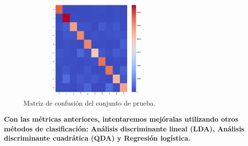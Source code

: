 \documentclass[paper=letter, fontsize=11pt]{scrartcl}
\numberwithin{equation}{section} %
\numberwithin{figure}{section} %
\numberwithin{table}{section} %
\begin{document}
\begin{figure}[H]
    \centering
    \includegraphics[width=8cm, height=5cm]{figure/baseline_confusion.png}
    \caption{Matriz de confusión del conjunto de prueba.}
    \label{fig:baseline_confusion}
\end{figure}


\textbf{Con las métricas anteriores, intentaremos mejóralas utilizando otros métodos de clasificación: Análisis discriminante lineal (LDA), Análisis discriminante cuadrática (QDA) y Regresión logística.}
\end{document}

